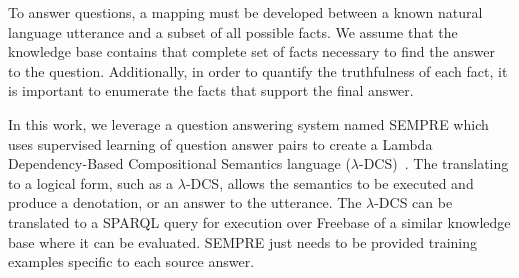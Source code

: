To answer questions, a mapping must be developed between a known
natural language utterance and a subset of all possible facts.
We assume that the knowledge base contains that complete set of facts necessary
to find the answer to the question.
Additionally, in order to quantify the truthfulness of each fact, it is
important to enumerate the facts that support the final answer.


In this work, we leverage a question answering system named SEMPRE which uses supervised
learning of question answer pairs to create a Lambda Dependency-Based
Compositional Semantics language (\(\lambda\)-DCS)~\cite{berant2013semantic}.
The translating to a logical form, such as a \(\lambda\)-DCS, allows the
semantics to be executed and produce a denotation, or an answer to the utterance.
The \(\lambda\)-DCS can be translated to a SPARQL query for execution over 
Freebase of a similar knowledge base where it can be evaluated.
SEMPRE just needs to be provided training examples specific to each source answer.



